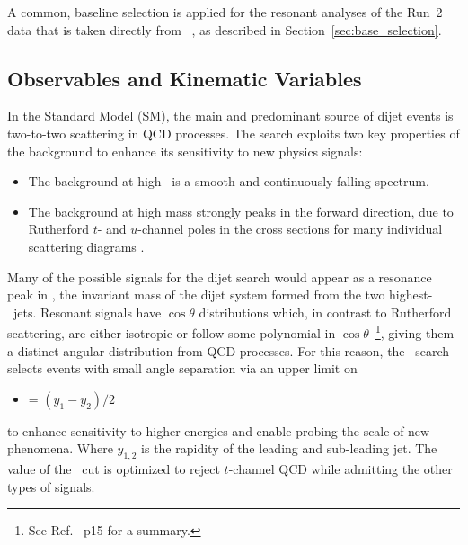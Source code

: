 A common, baseline selection is applied for the resonant  analyses of
the Run~2 data that is taken directly from ~\cite{Nishu:2646455}, as
described in Section~\ref{sec:base_selection}. 


\subsection{Observables and Kinematic Variables}
In the Standard Model (SM), the main and predominant source of dijet
events is two-to-two scattering in QCD processes. The search exploits
two key properties of the background to enhance its sensitivity to new
physics signals:

\begin{itemize}
	\item The background at high \mjj\ is a smooth and continuously falling spectrum.
	\item The background at high mass strongly peaks in the forward
direction, due to Rutherford $t$- and $u$-channel poles in the cross sections
for many individual scattering diagrams \cite{Harris:2011bh}.
\end{itemize}

Many of the possible signals for the dijet search would appear as a
resonance peak in \mjj, the invariant mass of the dijet system formed
from the two highest-\pT\ jets. Resonant signals have $\cos{\theta}$
distributions which, in contrast to Rutherford scattering, are either
isotropic or follow some polynomial in $\cos{\theta}$~\footnote{See
Ref.~\cite{Harris:2011bh} p15 for a summary.}, giving them a distinct
angular distribution from QCD processes. For this reason, the \mjj\
search selects events with small angle separation via an upper limit on
\begin{itemize}
	\item \ystar = $(y_1-y_2)/2$
\end{itemize}
to enhance sensitivity to higher energies and enable probing the scale
of new phenomena. Where $y_{1,2}$ is the rapidity of the leading and
sub-leading jet. The value of the \ystar\ cut is optimized to reject
$t$-channel QCD while admitting the other types of signals.

